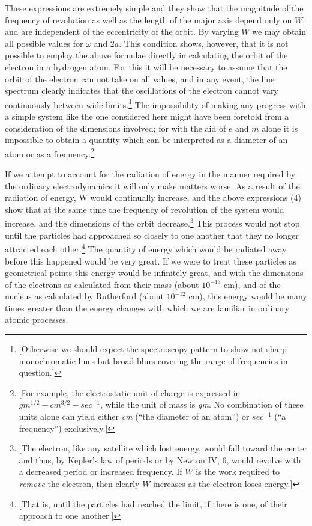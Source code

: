These expressions are extremely simple and they show that the magnitude
of the frequency of revolution as well as the length of the major axis
depend only on $W$, and are independent of the eccentricity of the
orbit. By varying $W$ we may obtain all possible values for
$\omega$ and 2$a$. This condition shows, however, that it is not
possible to employ the above formulae directly in calculating the orbit
of the electron in a hydrogen atom. For this it will be necessary to
assume that the orbit of the electron can not take on all values, and in
any event, the line spectrum clearly indicates that the oscillations of
the electron cannot vary continuously between wide limits.\footnote{{[}Otherwise
  we should expect the spectroscopy pattern to show not sharp
  monochromatic lines but broad blurs covering the range of frequencies
  in question.{]}} The impossibility of making any progress with a
simple system like the one considered here might have been foretold from
a consideration of the dimensions involved; for with the aid of $e$
and $m$ alone it is impossible to obtain a quantity which can be
interpreted as a diameter of an atom or as a frequency.\footnote{{[}For
  example, the electrostatic unit of charge is expressed in
  $gm^{1/2}-cm^{3/2}-sec^{-1}$, while the unit of mass is
  \emph{gm}. No combination of these units alone can yield either
  \emph{cm} (``the diameter of an atom'') or $sec^{-1}$ (``a
  frequency'') exclusively.{]}}

If we attempt to account for the radiation of energy in the manner
required by the ordinary electrodynamics it will only make matters
worse. As a result of the radiation of energy, W would continually
increase, and the above expressions (4) show that at the same time the
frequency of revolution of the system would increase, and the dimensions
of the orbit decrease.\footnote{{[}The electron, like any satellite
  which lost energy, would fall toward the center and thus, by Kepler's
  law of periods or by Newton IV, 6, would revolve with a decreased
  period or increased frequency. If $W$ is the work required to
  \emph{remove} the electron, then clearly $W$ increases as the
  electron loses energy.{]}} This process would not stop until the
particles had approached so closely to one another that they no longer
attracted each other.\footnote{{[}That is, until the particles had
  reached the limit, if there is one, of their approach to one
  another.{]}} The quantity of energy which would be radiated away
before this happened would be very great. If we were to treat these
particles as geometrical points this energy would be infinitely great,
and with the dimensions of the electrons as calculated from their mass
(about $10^{-13}$ cm), and of the nucleus as calculated by Rutherford (about
$10^{-12}$ cm), this energy would be many times greater than the energy
changes with which we are familiar in ordinary atomic processes.

